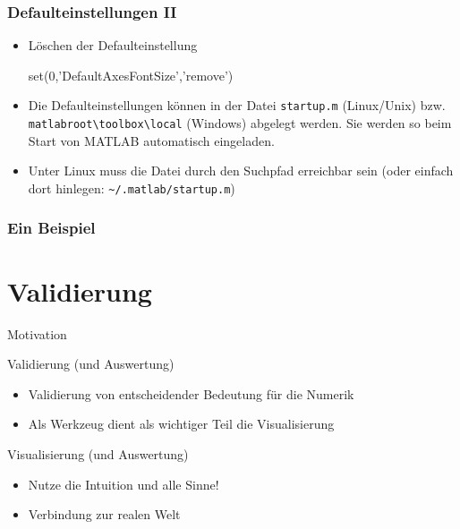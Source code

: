 \documentclass[hyperref={xetex}]{beamer}
\begin{document}
%
%
\begin{frame}[fragile]\frametitle{Defaulteinstellungen II}
\begin{itemize}
\item L\"oschen der Defaulteinstellung
\begin{matlabin}
set(0,'DefaultAxesFontSize','remove')
\end{matlabin}
\item Die Defaulteinstellungen k\"onnen in der Datei \verb!startup.m!  (Linux/Unix)
   bzw. \verb!matlabroot\toolbox\local! (Windows) abgelegt werden. Sie werden so
  beim Start von MATLAB automatisch eingeladen. 
\item Unter Linux muss die Datei durch den Suchpfad  erreichbar
  sein (oder einfach dort hinlegen: \verb!~/.matlab/startup.m!)
\end{itemize} 
\end{frame}
\begin{frame}[fragile]\frametitle{Ein Beispiel}
\end{frame}


\section{Validierung}

\begin{frame}{Motivation}
  \begin{block}{Validierung (und Auswertung)}
\begin{itemize}
  \item Validierung von entscheidender Bedeutung für die Numerik
  \item Als Werkzeug dient als wichtiger Teil die Visualisierung 
\end{itemize}
  \end{block}
  \begin{block}{Visualisierung (und Auswertung)}
    \begin{itemize}
  \item Nutze die Intuition und alle Sinne!
      \item Verbindung zur realen Welt
    \end{itemize}
  \end{block}
\end{frame}
\end{document}
